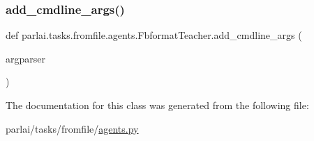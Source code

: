 \subsubsection{\texorpdfstring{add\+\_\+cmdline\+\_\+args()}{add\_cmdline\_args()}}
{\footnotesize\ttfamily def parlai.\+tasks.\+fromfile.\+agents.\+Fbformat\+Teacher.\+add\+\_\+cmdline\+\_\+args (\begin{DoxyParamCaption}\item[{}]{argparser }\end{DoxyParamCaption})\hspace{0.3cm}{\ttfamily [static]}}



The documentation for this class was generated from the following file\+:\begin{DoxyCompactItemize}
\item 
parlai/tasks/fromfile/\hyperlink{parlai_2tasks_2fromfile_2agents_8py}{agents.\+py}\end{DoxyCompactItemize}
